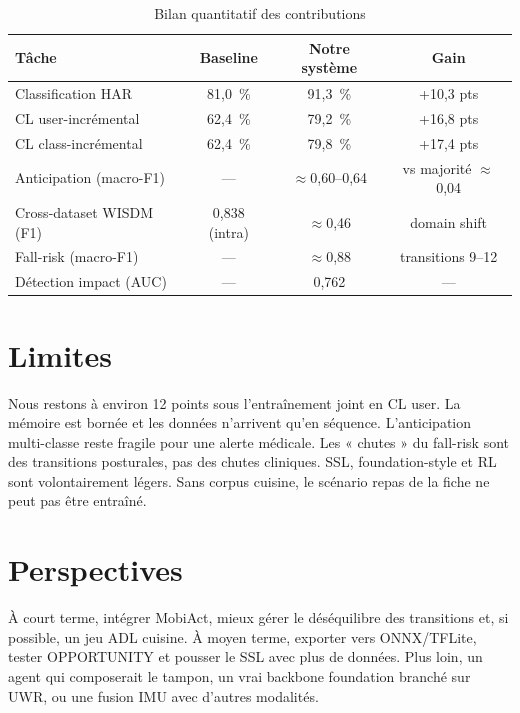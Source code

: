 \documentclass[a4paper,12pt]{report}
\begin{document}
\begin{table}[H]
\centering
\small
\begin{tabularx}{0.92\textwidth}{|Y|c|c|c|}
\hline
\textbf{Tâche} & \textbf{Baseline} & \textbf{Notre système} & \textbf{Gain} \\
\hline
Classification HAR       & 81,0~\% & 91,3~\% & +10,3 pts \\
CL user-incrémental        & 62,4~\% & 79,2~\% & +16,8 pts \\
CL class-incrémental       & 62,4~\% & 79,8~\% & +17,4 pts \\
Anticipation (macro-F1)    & —       & $\approx$0,60--0,64 & vs majorité $\approx$0,04 \\
Cross-dataset WISDM (F1)   & 0,838 (intra) & $\approx$0,46 & domain shift \\
Fall-risk (macro-F1)       & —       & $\approx$0,88 & transitions 9--12 \\
Détection impact (AUC)     & —       & 0,762   & — \\
\hline
\end{tabularx}
\caption{Bilan quantitatif des contributions}
\label{tab:bilan_conclusion}
\end{table}

\section{Limites}

Nous restons à environ 12 points sous l'entraînement joint en CL user. La
mémoire est bornée et les données n'arrivent qu'en séquence. L'anticipation
multi-classe reste fragile pour une alerte médicale. Les « chutes » du
fall-risk sont des transitions posturales, pas des chutes cliniques. SSL,
foundation-style et RL sont volontairement légers. Sans corpus cuisine, le
scénario repas de la fiche ne peut pas être entraîné.

\section{Perspectives}

À court terme, intégrer MobiAct, mieux gérer le déséquilibre des transitions
et, si possible, un jeu ADL cuisine. À moyen terme, exporter vers ONNX/TFLite,
tester OPPORTUNITY et pousser le SSL avec plus de données. Plus loin, un
agent qui composerait le tampon, un vrai backbone foundation
\parencite{yuan2024} branché sur UWR, ou une fusion IMU avec d'autres
modalités.
\end{document}

